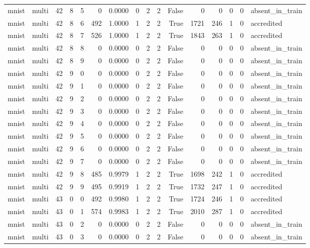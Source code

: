 \begin{tabular}{llrrrrrrrrrrrrrl}
mnist & multi & 42 & 8 & 5 & 0 & 0.0000 & 0 & 2 & 2 & False & 0 & 0 & 0 & 0 & absent\_in\_train \\
mnist & multi & 42 & 8 & 6 & 492 & 1.0000 & 1 & 2 & 2 & True & 1721 & 246 & 1 & 0 & accredited \\
mnist & multi & 42 & 8 & 7 & 526 & 1.0000 & 1 & 2 & 2 & True & 1843 & 263 & 1 & 0 & accredited \\
mnist & multi & 42 & 8 & 8 & 0 & 0.0000 & 0 & 2 & 2 & False & 0 & 0 & 0 & 0 & absent\_in\_train \\
mnist & multi & 42 & 8 & 9 & 0 & 0.0000 & 0 & 2 & 2 & False & 0 & 0 & 0 & 0 & absent\_in\_train \\
mnist & multi & 42 & 9 & 0 & 0 & 0.0000 & 0 & 2 & 2 & False & 0 & 0 & 0 & 0 & absent\_in\_train \\
mnist & multi & 42 & 9 & 1 & 0 & 0.0000 & 0 & 2 & 2 & False & 0 & 0 & 0 & 0 & absent\_in\_train \\
mnist & multi & 42 & 9 & 2 & 0 & 0.0000 & 0 & 2 & 2 & False & 0 & 0 & 0 & 0 & absent\_in\_train \\
mnist & multi & 42 & 9 & 3 & 0 & 0.0000 & 0 & 2 & 2 & False & 0 & 0 & 0 & 0 & absent\_in\_train \\
mnist & multi & 42 & 9 & 4 & 0 & 0.0000 & 0 & 2 & 2 & False & 0 & 0 & 0 & 0 & absent\_in\_train \\
mnist & multi & 42 & 9 & 5 & 0 & 0.0000 & 0 & 2 & 2 & False & 0 & 0 & 0 & 0 & absent\_in\_train \\
mnist & multi & 42 & 9 & 6 & 0 & 0.0000 & 0 & 2 & 2 & False & 0 & 0 & 0 & 0 & absent\_in\_train \\
mnist & multi & 42 & 9 & 7 & 0 & 0.0000 & 0 & 2 & 2 & False & 0 & 0 & 0 & 0 & absent\_in\_train \\
mnist & multi & 42 & 9 & 8 & 485 & 0.9979 & 1 & 2 & 2 & True & 1698 & 242 & 1 & 0 & accredited \\
mnist & multi & 42 & 9 & 9 & 495 & 0.9919 & 1 & 2 & 2 & True & 1732 & 247 & 1 & 0 & accredited \\
mnist & multi & 43 & 0 & 0 & 492 & 0.9980 & 1 & 2 & 2 & True & 1724 & 246 & 1 & 0 & accredited \\
mnist & multi & 43 & 0 & 1 & 574 & 0.9983 & 1 & 2 & 2 & True & 2010 & 287 & 1 & 0 & accredited \\
mnist & multi & 43 & 0 & 2 & 0 & 0.0000 & 0 & 2 & 2 & False & 0 & 0 & 0 & 0 & absent\_in\_train \\
mnist & multi & 43 & 0 & 3 & 0 & 0.0000 & 0 & 2 & 2 & False & 0 & 0 & 0 & 0 & absent\_in\_train \\

\end{tabular}
